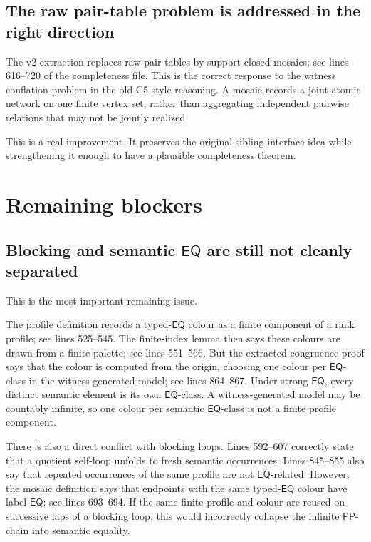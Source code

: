 \documentclass[11pt]{article}
\newcommand{\PP}{\mathsf{PP}}
\newcommand{\EQ}{\mathsf{EQ}}
\begin{document}
\subsection{The raw pair-table problem is addressed in the right direction}

The v2 extraction replaces raw pair tables by support-closed mosaics; see lines
616--720 of the completeness file.  This is the correct response to the witness
conflation problem in the old C5-style reasoning.  A mosaic records a joint
atomic network on one finite vertex set, rather than aggregating independent
pairwise relations that may not be jointly realized.

This is a real improvement.  It preserves the original sibling-interface idea
while strengthening it enough to have a plausible completeness theorem.

\section{Remaining blockers}

\subsection{Blocking and semantic \texorpdfstring{$\EQ$}{EQ} are still not cleanly separated}

This is the most important remaining issue.

The profile definition records a typed-\(\EQ\) colour as a finite component of a
rank profile; see lines 525--545.  The finite-index lemma then says these colours
are drawn from a finite palette; see lines 551--566.  But the extracted
congruence proof says that the colour is computed from the origin, choosing one
colour per \(\EQ\)-class in the witness-generated model; see lines 864--867.
Under strong \(\EQ\), every distinct semantic element is its own \(\EQ\)-class.
A witness-generated model may be countably infinite, so one colour per semantic
\(\EQ\)-class is not a finite profile component.

There is also a direct conflict with blocking loops.  Lines 592--607 correctly
state that a quotient self-loop unfolds to fresh semantic occurrences.  Lines
845--855 also say that repeated occurrences of the same profile are not
\(\EQ\)-related.  However, the mosaic definition says that endpoints with the
same typed-\(\EQ\) colour have label \(\EQ\); see lines 693--694.  If the same
finite profile and colour are reused on successive laps of a blocking loop, this
would incorrectly collapse the infinite \(\PP\)-chain into semantic equality.
\end{document}
